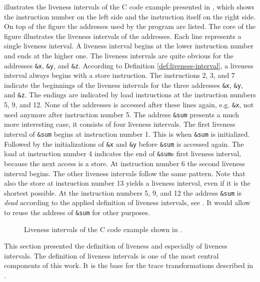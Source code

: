 \documentclass[onecolumn, openright, master, english, signatures]{dbrgrptt}
\begin{document}
 illustrates the liveness intervals of the C code example presented in , which shows the instruction number on the left side and the instruction itself on the right side.
On top of the figure the addresses used by the program are listed.
The core of the figure illustrates the liveness intervals of the addresses.
Each line represents a single liveness interval.
A liveness interval begins at the lower instruction number and ends at the higher one.
The liveness intervals are quite obvious for the addresses \texttt{\&x}, \texttt{\&y}, and \texttt{\&z}.
According to Definition \ref{def:liveness-interval}, a liveness interval always begins with a store instruction.
The instructions 2, 3, and 7 indicate the beginnings of the liveness intervals for the three addresses \texttt{\&x}, \texttt{\&y}, and \texttt{\&z}.
The endings are indicated by load instructions at the instruction numbers 5, 9, and 12.
None of the addresses is accessed after these lines again, e.g. \texttt{\&x}, not used anymore after instruction number 5.
The address \texttt{\&sum} presents a much more interesting case, it consists of four liveness intervals.
The first liveness interval of \texttt{\&sum} begins at instruction number 1.
This is when \texttt{\&sum} is initialized.
Followed by the initializations of \texttt{\&x} and \texttt{\&y} before \texttt{\&sum} is accessed again.
The load at instruction number 4 indicates the end of \texttt{\&sum}s first liveness interval, because the next access is a store.
At instruction number 6 the second liveness interval begins.
The other liveness intervals follow the same pattern.
Note that also the store at instruction number 13 yields a liveness interval, even if it is the shortest possible.
At the instruction numbers 5, 9, and 12 the address \texttt{\&sum} is \emph{dead} according to the applied definition of liveness intervals, see .
It would allow to reuse the address of \texttt{\&sum} for other purposes.

\begin{figure}[!ht]
  \centering
  
  \caption{Liveness intervals of the C code example shown in .}
  \label{fig:liveness-intervals-example}
\end{figure}

This section presented the definition of liveness and especially of liveness intervals.
The definition of liveness intervals is one of the most central components of this work.
It is the base for the trace transformations described in .
\end{document}

